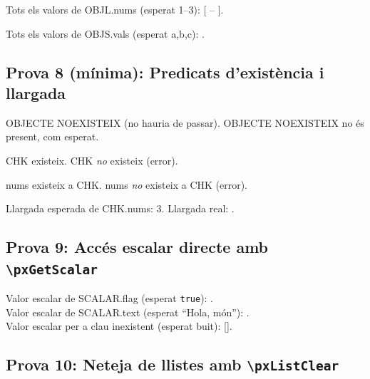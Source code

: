 \documentclass{article}
\begin{document}
Tots els valors de OBJL.nums (esperat 1--3): [ -- ].

\bigskip


Tots els valors de OBJS.vals (esperat a,b,c): .

\bigskip

\subsection*{Prova 8 (mínima): Predicats d'existència i llargada}

	{OBJECTE NOEXISTEIX (no hauria de passar).}
	{OBJECTE NOEXISTEIX no és present, com esperat.}


	{CHK existeix.}
	{CHK \emph{no} existeix (error).}

	{nums existeix a CHK.}
	{nums \emph{no} existeix a CHK (error).}

Llargada esperada de CHK.nums: 3.\quad
Llargada real: .

\bigskip

\subsection*{Prova 9: Accés escalar directe amb \texttt{\textbackslash pxGetScalar}}


Valor escalar de SCALAR.flag (esperat \texttt{true}): .\\
Valor escalar de SCALAR.text (esperat ``Hola, món''): .\\
Valor escalar per a clau inexistent (esperat buit): [].

\bigskip

\subsection*{Prova 10: Neteja de llistes amb \texttt{\textbackslash pxListClear}}

\end{document}
